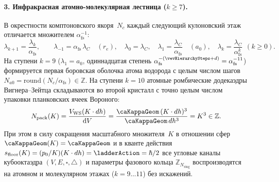 \paragraph{3. Инфракрасная атомно-молекулярная лестница ($k\ge 7$).}
В окрестности комптоновского якоря~$N_c$ каждый следующий кулоновский этаж отличается множителем $\alpha_{\mathrm{fs}}^{-1}$:
\begin{equation}
\label{eq:ir-hop-ladder}
  \lambda_{k+1} = \frac{\lambda_k}{\alpha_{\mathrm{fs}}},\qquad
  \lambda_{-1} = \alpha_{\mathrm{fs}}\,\lambda_C\quad(r_e),\quad
  \lambda_0 = \lambda_C,\quad
  \lambda_1 = \frac{\lambda_C}{\alpha_{\mathrm{fs}}}\quad(a_0),\quad
  \lambda_k = \frac{\lambda_C}{\alpha_{\mathrm{fs}}^{k}}\ \ (k\ge 0).
\end{equation}
На ступени $k=9$ ($\lambda_1 = a_0$, одиннадцатая степень $\alpha_{\mathrm{fs}}^{-(\vevHierarchySteps+d)}=\alpha_{\mathrm{fs}}^{-11}$)
формируется первая боровская оболочка атома водорода с целым числом шагов $N_{a0}=\mathrm{round}(N_c/\alpha_{\mathrm{fs}})\in\mathbb{Z}$.
На ступени $k=10$ атомные ромбические додекаэдры Вигнера--Зейтца складываются во второй кристалл
с точно целым числом упаковки планковских ячеек Вороного:
\[
  N_{\mathrm{pack}}(K) = \frac{V_{\mathrm{WS}}(K\cdot dh)}{\mathrm{d}V} = \frac{\caKappaGeom\,(K\cdot dh)^3}{\caKappaGeom\,dh^3} = K^3 \in \mathbb{Z}.
\]
При этом в силу сокращения масштабного множителя~$K$ в отношении сфер $\caKappaGeom(K)=\caKappaGeom$
и в кванте действия $s_{\mathrm{floor}}(K)=(p_0/K)(K\cdot dh)=\ladderAction=\hbar/2$
все угловые каналы кубооктаэдра $(V,E,\square,\triangle)$ и параметры фазового кольца $\mathbb{Z}_{N_{\mathrm{ring}}}$
воспроизводятся на атомном и молекулярном этажах ($k=9\ldots 11$) без искажений.

